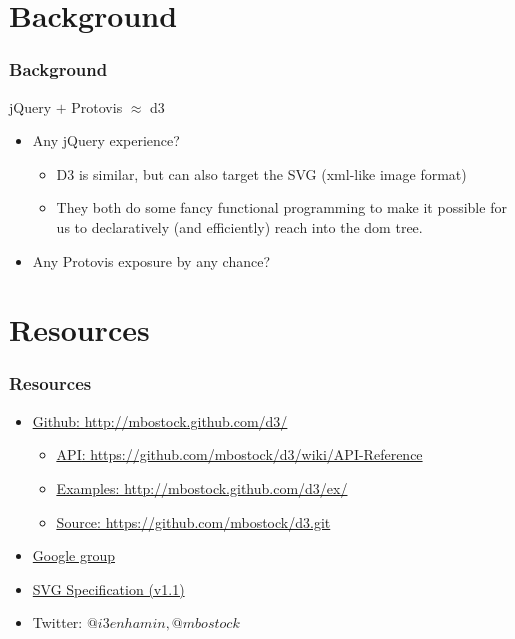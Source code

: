 \documentclass{beamer}
\begin{document}
\section{Background}

\begin{frame}
    \frametitle{Background}
    \begin{block}{jQuery $+$ Protovis $\approx$ d3}
        \begin{itemize}
        \pause
        \item Any jQuery experience?
        \pause
            \begin{itemize}
            \item D3 is similar, but can also target the SVG (xml-like image format)
        \pause
            \item They both do some fancy functional programming to make it possible 
                  for us to declaratively (and efficiently) reach into the dom tree.
            \end{itemize}
        \pause
        \item Any Protovis exposure by any chance?
       \end{itemize}
    \end{block}
\end{frame}


\section{Resources}

\begin{frame}
    \frametitle{Resources}
        \pause
        \begin{itemize}
        \item \href{http://mbostock.github.com/d3/}{\underline{Github}: http://mbostock.github.com/d3/}
            \begin{itemize}
            \item \href{https://github.com/mbostock/d3/wiki/API-Reference}{\underline{API}: https://github.com/mbostock/d3/wiki/API-Reference}
            \item \href{http://mbostock.github.com/d3/ex/}{\underline{Examples}: http://mbostock.github.com/d3/ex/}
            \item \href{https://github.com/mbostock/d3.git}{\underline{Source}: https://github.com/mbostock/d3.git}
            \end{itemize}
        \pause
        \item \href{http://groups.google.com/group/d3-js?pli=1}{Google group}
        \pause
        \item \href{http://www.w3.org/TR/SVG/}{SVG Specification (v1.1)}
        \pause
        \item Twitter: $@i3enhamin, @mbostock$
        \end{itemize}
\end{frame}
\end{document}
